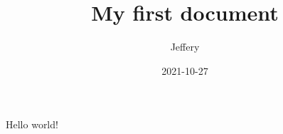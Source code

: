 \documentclass{article}
\title{My first document}
\date{2021-10-27}
\author{Jeffery}
\begin{document}
	\maketitle
	\newpage
	Hello world!
\end{document}
